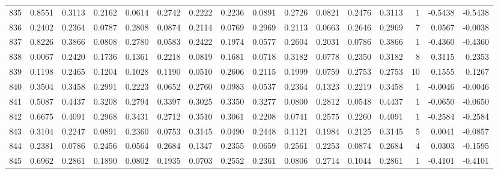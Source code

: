 \begin{tabular}{lrrrrrrrrrrrrrrr}
835 &      0.8551 &  0.3113 &  0.2162 &  0.0614 &  0.2742 &  0.2222 &  0.2236 &  0.0891 &  0.2726 &  0.0821 &   0.2476 &     0.3113 &      1 &                   -0.5438 &                    -0.5438 \\
836 &      0.2402 &  0.2364 &  0.0787 &  0.2808 &  0.0874 &  0.2114 &  0.0769 &  0.2969 &  0.2113 &  0.0663 &   0.2646 &     0.2969 &      7 &                    0.0567 &                    -0.0038 \\
837 &      0.8226 &  0.3866 &  0.0808 &  0.2780 &  0.0583 &  0.2422 &  0.1974 &  0.0577 &  0.2604 &  0.2031 &   0.0786 &     0.3866 &      1 &                   -0.4360 &                    -0.4360 \\
838 &      0.0067 &  0.2420 &  0.1736 &  0.1361 &  0.2218 &  0.0819 &  0.1681 &  0.0718 &  0.3182 &  0.0778 &   0.2350 &     0.3182 &      8 &                    0.3115 &                     0.2353 \\
839 &      0.1198 &  0.2465 &  0.1204 &  0.1028 &  0.1190 &  0.0510 &  0.2606 &  0.2115 &  0.1999 &  0.0759 &   0.2753 &     0.2753 &     10 &                    0.1555 &                     0.1267 \\
840 &      0.3504 &  0.3458 &  0.2991 &  0.2223 &  0.0652 &  0.2760 &  0.0983 &  0.0537 &  0.2364 &  0.1323 &   0.2219 &     0.3458 &      1 &                   -0.0046 &                    -0.0046 \\
841 &      0.5087 &  0.4437 &  0.3208 &  0.2794 &  0.3397 &  0.3025 &  0.3350 &  0.3277 &  0.0800 &  0.2812 &   0.0548 &     0.4437 &      1 &                   -0.0650 &                    -0.0650 \\
842 &      0.6675 &  0.4091 &  0.2968 &  0.3431 &  0.2712 &  0.3510 &  0.3061 &  0.2208 &  0.0741 &  0.2575 &   0.2260 &     0.4091 &      1 &                   -0.2584 &                    -0.2584 \\
843 &      0.3104 &  0.2247 &  0.0891 &  0.2360 &  0.0753 &  0.3145 &  0.0490 &  0.2448 &  0.1121 &  0.1984 &   0.2125 &     0.3145 &      5 &                    0.0041 &                    -0.0857 \\
844 &      0.2381 &  0.0786 &  0.2456 &  0.0564 &  0.2684 &  0.1347 &  0.2355 &  0.0659 &  0.2561 &  0.2253 &   0.0874 &     0.2684 &      4 &                    0.0303 &                    -0.1595 \\
845 &      0.6962 &  0.2861 &  0.1890 &  0.0802 &  0.1935 &  0.0703 &  0.2552 &  0.2361 &  0.0806 &  0.2714 &   0.1044 &     0.2861 &      1 &                   -0.4101 &                    -0.4101 \\

\end{tabular}
